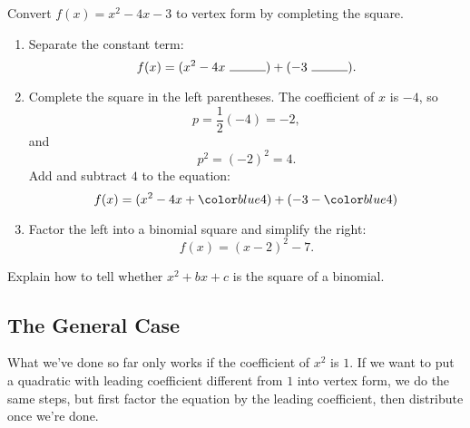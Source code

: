 \documentclass{ximera}
\begin{document}
\begin{example}
Convert $f(x) = x^2 - 4x - 3$ to vertex form by completing the square.

\begin{explanation}
\begin{enumerate}[label=\arabic*.]
    \item Separate the constant term:
    $$
        f(x) = (x^2 - 4x\ \rule{1cm}{0.15mm}) + (-3\ \rule{1cm}{0.15mm}).
    $$
    \item Complete the square in the left parentheses. The coefficient of $x$ is $-4$, so
    $$
        p = \frac{1}{2}(-4) = -2,
    $$
    and
    $$
        p^2 = (-2)^2 = 4.
    $$
    Add and subtract $4$ to the equation:
    $$
        f(x) = (x^2 - 4x + \substitute{4}) + (-3-\substitute{4})
    $$
    \item Factor the left into a binomial square and simplify the right:
    $$
        f(x) = (x-2)^2 - 7.
    $$
\end{enumerate}
\end{explanation}
\end{example}

\begin{callout}
Explain how to tell whether $x^2 + bx + c$ is the square of a binomial.
\end{callout}
   
\subsection{The General Case}
   
What we've done so far only works if the coefficient of $x^2$ is $1$. If we want to put a quadratic with leading coefficient different from $1$ into vertex form, we do the same steps, but first factor the equation by the leading coefficient, then distribute once we're done.
\end{document}
